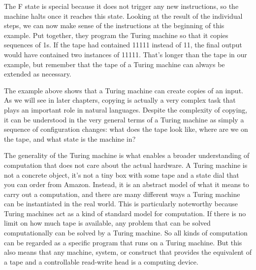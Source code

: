 \begin{examplebox}
\begin{center}



    \end{center}
    
    The F state is special because it does not trigger any new instructions, so the machine halts once it reaches this state.
    Looking at the result of the individual steps, we can now make sense of the instructions at the beginning of this example.
    Put together, they program the Turing machine so that it copies sequences of 1s.
    If the tape had contained 11111 instead of 11, the final output would have contained two instances of 11111.
    That's longer than the tape in our example, but remember that the tape of a Turing machine can always be extended as necessary.
    \label{ex:Formal_turingmachine}
\end{examplebox}

The example above shows that a Turing machine can create copies of an input.
As we will see in later chapters, copying is actually a very complex task that plays an important role in natural languages.
Despite the complexity of copying, it can be understood in the very general terms of a Turing machine as simply a sequence of configuration changes: what does the tape look like, where are we on the tape, and what state is the machine in?

The generality of the Turing machine is what enables a broader understanding of computation that does not care about the actual hardware.
A Turing machine is not a concrete object, it's not a tiny box with some tape and a state dial that you can order from Amazon.
Instead, it is an abstract model of what it means to carry out a computation, and there are many different ways a Turing machine can be instantiated in the real world.
This is particularly noteworthy because Turing machines act as a kind of standard model for computation.
If there is no limit on how much tape is available, any problem that can be solved computationally can be solved by a Turing machine.
So all kinds of computation can be regarded as a specific program that runs on a Turing machine.
But this also means that any machine, system, or construct that provides the equivalent of a tape and a controllable read-write head is a computing device.

